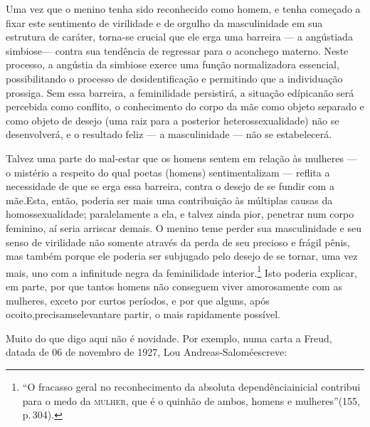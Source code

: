 Uma vez que o menino tenha sido reconhecido como homem, e tenha
começado a fixar este sentimento de virilidade e de orgulho da
masculinidade em sua estrutura de caráter, torna-se crucial que ele
erga uma barreira --- a angústia\idxangushom[|(] da simbiose\idxhomossimb[|(] --- contra sua tendência
de regressar para o aconchego materno.\idxconfeangu{} Neste processo, a angústia da
simbiose exerce uma função normalizadora essencial, possibilitando o
processo de desidentificação e permitindo que a individuação prossiga.
Sem essa barreira, a feminilidade persistirá, a situação edípica\idxconfe[|(] não
será percebida como conflito, o conhecimento do corpo da mãe como
objeto separado e como objeto de desejo (uma raiz para a posterior
heterossexualidade) não se desenvolverá, e o resultado feliz --- a
masculinidade --- não se estabelecerá.

Talvez uma parte do mal-estar que os homens sentem em relação às
mulheres --- o mistério a respeito do qual poetas (homens)
sentimentalizam --- reflita a necessidade de que se erga essa
barreira, contra o desejo de se fundir com a mãe.\idxmascupap[|)] Esta, então, poderia
ser mais uma contribuição às múltiplas causas da homossexualidade;
paralelamente a ela, e talvez ainda pior, penetrar num corpo feminino,
aí seria arriscar demais. O menino teme perder sua masculinidade e seu
senso de virilidade não somente através da perda de seu precioso e
frágil pênis, mas também porque ele poderia ser subjugado pelo desejo
de se tornar, uma vez mais, uno com a infinitude negra da feminilidade
interior.\footnote{ ``O fracasso geral no reconhecimento
da absoluta dependência\idxangushom[|nn] inicial contribui para o medo da \textsc{mulher}, que é
o quinhão de ambos, homens e mulheres''\idxhomossimb[|nn] (155, p.\,304).}
Isto poderia explicar, em parte, por que tantos homens não conseguem
viver amorosamente com as mulheres, exceto por curtos períodos, e por
que alguns, após o\idxmascsu[|)] coito,\idxangusimb[|)] precisam\idxangushom[|)] se\idxmaesmasc[|)] levantar\idxhomossimb[|)] e partir, o mais
rapidamente possível.\idxangus[|)]

Muito do que digo aqui não é novidade. Por exemplo, numa carta a
Freud, datada de 06 de novembro de 1927, Lou Andreas-Salomé\idxsalome[|(] escreve:

